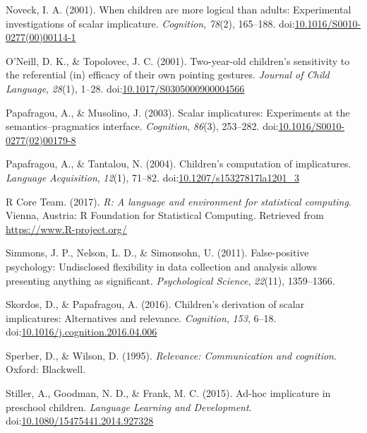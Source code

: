 \documentclass[man]{apa6}
\begin{document}
\hypertarget{ref-noveck2001}{}
Noveck, I. A. (2001). When children are more logical than adults:
Experimental investigations of scalar implicature. \emph{Cognition},
\emph{78}(2), 165--188.
doi:\href{https://doi.org/10.1016/S0010-0277(00)00114-1}{10.1016/S0010-0277(00)00114-1}

\hypertarget{ref-oneill2001}{}
O'Neill, D. K., \& Topolovec, J. C. (2001). Two-year-old children's
sensitivity to the referential (in) efficacy of their own pointing
gestures. \emph{Journal of Child Language}, \emph{28}(1), 1--28.
doi:\href{https://doi.org/10.1017/S0305000900004566}{10.1017/S0305000900004566}

\hypertarget{ref-papafragou2003}{}
Papafragou, A., \& Musolino, J. (2003). Scalar implicatures: Experiments
at the semantics--pragmatics interface. \emph{Cognition}, \emph{86}(3),
253--282.
doi:\href{https://doi.org/10.1016/S0010-0277(02)00179-8}{10.1016/S0010-0277(02)00179-8}

\hypertarget{ref-papafragou2004}{}
Papafragou, A., \& Tantalou, N. (2004). Children's computation of
implicatures. \emph{Language Acquisition}, \emph{12}(1), 71--82.
doi:\href{https://doi.org/10.1207/s15327817la1201_3}{10.1207/s15327817la1201\_3}

\hypertarget{ref-R-base}{}
R Core Team. (2017). \emph{R: A language and environment for statistical
computing}. Vienna, Austria: R Foundation for Statistical Computing.
Retrieved from \url{https://www.R-project.org/}

\hypertarget{ref-simmons2011false}{}
Simmons, J. P., Nelson, L. D., \& Simonsohn, U. (2011). False-positive
psychology: Undisclosed flexibility in data collection and analysis
allows presenting anything as significant. \emph{Psychological Science},
\emph{22}(11), 1359--1366.

\hypertarget{ref-skordos2016}{}
Skordos, D., \& Papafragou, A. (2016). Children's derivation of scalar
implicatures: Alternatives and relevance. \emph{Cognition}, \emph{153},
6--18.
doi:\href{https://doi.org/10.1016/j.cognition.2016.04.006}{10.1016/j.cognition.2016.04.006}

\hypertarget{ref-sperber1986}{}
Sperber, D., \& Wilson, D. (1995). \emph{Relevance: Communication and
cognition}. Oxford: Blackwell.

\hypertarget{ref-stiller2015}{}
Stiller, A., Goodman, N. D., \& Frank, M. C. (2015). Ad-hoc implicature
in preschool children. \emph{Language Learning and Development}.
doi:\href{https://doi.org/10.1080/15475441.2014.927328}{10.1080/15475441.2014.927328}
\end{document}
